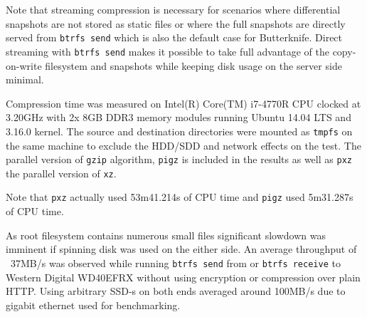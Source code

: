 \documentclass[a4paper,11pt]{kth-mag}
\begin{document}
Note that streaming compression is necessary for scenarios
where differential snapshots are not stored as static files
or where the full snapshots are directly served from
\texttt{btrfs send} which is also the default case for Butterknife.
Direct streaming with \texttt{btrfs send} makes it possible
to take full advantage of the copy-on-write filesystem
and snapshots while keeping disk usage on the server side minimal.

Compression time was measured on Intel(R) Core(TM) i7-4770R CPU 
clocked at 3.20GHz with 2x 8GB DDR3 memory modules running
Ubuntu 14.04 LTS and 3.16.0 kernel.
The source and destination directories were
mounted as \texttt{tmpfs} on the same 
machine to exclude the
HDD/SDD and network effects on the test.
The parallel version of \texttt{gzip} algorithm,
\texttt{pigz} is included in the results as well as \texttt{pxz}
the parallel version of \texttt{xz}.
\\


Note that \texttt{pxz} actually used 53m41.214s of CPU time
and \texttt{pigz} used 5m31.287s of CPU time.



As root filesystem contains numerous small files significant
slowdown was imminent if spinning disk was used on the either side.
An average throughput of ~37MB/s was observed while
running \texttt{btrfs send} from or \texttt{btrfs receive} to
Western Digital WD40EFRX without using encryption or compression
over plain HTTP.
Using arbitrary SSD-s on both ends averaged around 100MB/s
due to gigabit ethernet used for benchmarking.
\end{document}

